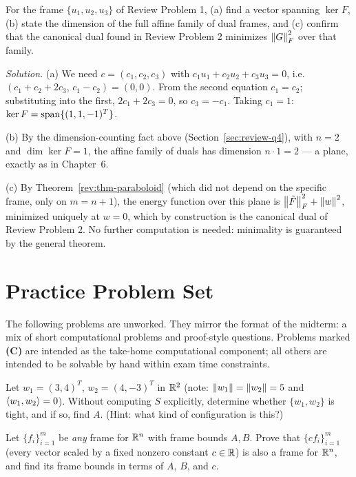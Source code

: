 \begin{examplebox}[title={Review Problem 4: The dual family, dimension and minimum}]
\label{rev:problem4}
For the frame $\{u_1,u_2,u_3\}$ of Review Problem 1, (a) find a vector
spanning $\ker F$, (b) state the dimension of the full affine family of
dual frames, and (c) confirm that the canonical dual found in Review
Problem 2 minimizes $\left\| G \right\|_F^2$ over that family.

\smallskip
\textit{Solution.} (a) We need $c=(c_1,c_2,c_3)$ with
$c_1u_1+c_2u_2+c_3u_3=0$, i.e.\ $(c_1+c_2+2c_3,\,c_1-c_2)=(0,0)$. From
the second equation $c_1=c_2$; substituting into the first,
$2c_1+2c_3=0$, so $c_3=-c_1$. Taking $c_1=1$: $\ker F=\operatorname{span}\{(1,1,-1)^T\}$.

(b) By the dimension-counting fact above (Section~\ref{sec:review-q4}),
with $n=2$ and $\dim\ker F=1$, the affine family of duals has dimension
$n\cdot1=2$ --- a plane, exactly as in Chapter~6.

(c) By Theorem~\ref{rev:thm-paraboloid} (which did not depend on the
specific frame, only on $m=n+1$), the energy function over this plane
is $\left\| \tilde F \right\|_F^2+\left\| w \right\|^2$, minimized uniquely at $w=0$, which
by construction is the canonical dual of Review Problem 2. No further
computation is needed: minimality is guaranteed by the general theorem.
\end{examplebox}

\section{Practice Problem Set}
\label{sec:practice-problems}

The following problems are unworked. They mirror the format of the
midterm: a mix of short computational problems and proof-style
questions. Problems marked \textbf{(C)} are intended as the take-home
computational component; all others are intended to be solvable by hand
within exam time constraints.

\begin{exercisebox}[title={Problem 1}]
Let $w_1=(3,4)^T$, $w_2=(4,-3)^T$ in $\mathbb{R}^2$ (note: $\left\| w_1 \right\|=\left\| w_2 \right\|=5$
and $\left\langle w_1, w_2 \right\rangle=0$). Without computing $S$ explicitly, determine
whether $\{w_1,w_2\}$ is tight, and if so, find $A$. (Hint: what kind of
configuration is this?)
\end{exercisebox}

\begin{exercisebox}[title={Problem 2}]
Let $\{f_i\}_{i=1}^m$ be \emph{any} frame for $\mathbb{R}^n$ with frame bounds
$A, B$. Prove that $\{cf_i\}_{i=1}^m$ (every vector scaled by a fixed
nonzero constant $c\in\mathbb{R}$) is also a frame for $\mathbb{R}^n$, and find its
frame bounds in terms of $A$, $B$, and $c$.
\end{exercisebox}

